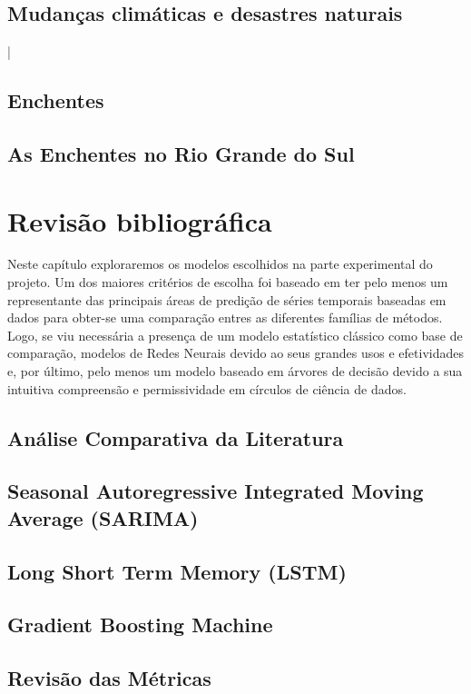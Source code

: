 \documentclass[
	12pt,				%
	openright,			%
	twoside,			%
	a4paper,			%
	english,			%
	french,				%
	spanish,			%
  japanese,
	brazil				%
	]{abntex2}
\begin{document}
    \section{Mudanças climáticas e desastres naturais}
    |
    \section{Enchentes}
    
    \section{As Enchentes no Rio Grande do Sul}
    

\chapter{Revisão bibliográfica}
Neste capítulo exploraremos os modelos escolhidos na parte experimental do projeto. Um dos maiores critérios de escolha
foi baseado em ter pelo menos um representante das principais áreas de predição de séries temporais baseadas em dados
para obter-se uma comparação entres as diferentes famílias de métodos. Logo, se viu necessária a presença de um modelo
estatístico clássico como base de comparação, modelos de Redes Neurais devido ao seus grandes usos e efetividades e, por
último, pelo menos um modelo baseado em árvores de decisão devido a sua intuitiva compreensão e permissividade em
círculos de ciência de dados. 
    \section{Análise Comparativa da Literatura}
    
    \section{Seasonal Autoregressive Integrated Moving Average (SARIMA)}
    
    \section{Long Short Term Memory (LSTM)}
    
    \section{Gradient Boosting Machine}
    
    \section{Revisão das Métricas}
    
\end{document}
